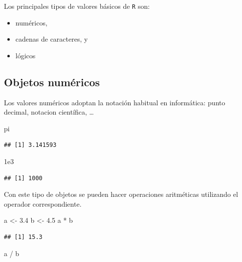 \documentclass[
]{book}
\newenvironment{Shaded}{\begin{snugshade}}{\end{snugshade}}
\newcommand{\FloatTok}[1]{\textcolor[rgb]{0.00,0.00,0.81}{#1}}
\newcommand{\NormalTok}[1]{#1}
\newcommand{\OtherTok}[1]{\textcolor[rgb]{0.56,0.35,0.01}{#1}}
\newcommand{\SpecialCharTok}[1]{\textcolor[rgb]{0.00,0.00,0.00}{#1}}
\theoremstyle{break}
\theoremstyle{nonumberplain}
\begin{document}
Los principales tipos de valores básicos de \texttt{R} son:

\begin{itemize}
\item
  numéricos,
\item
  cadenas de caracteres, y
\item
  lógicos
\end{itemize}

\hypertarget{objetos-numuxe9ricos}{%
\subsection{Objetos numéricos}\label{objetos-numuxe9ricos}}

Los valores numéricos adoptan
la notación habitual en informática: punto decimal, notacion científica, \ldots{}

\begin{Shaded}
\begin{Highlighting}[]
\NormalTok{pi}
\end{Highlighting}
\end{Shaded}

\begin{verbatim}
## [1] 3.141593
\end{verbatim}

\begin{Shaded}
\begin{Highlighting}[]
\FloatTok{1e3}
\end{Highlighting}
\end{Shaded}

\begin{verbatim}
## [1] 1000
\end{verbatim}

Con este tipo de objetos se pueden hacer operaciones aritméticas
utilizando el operador correspondiente.

\begin{Shaded}
\begin{Highlighting}[]
\NormalTok{a }\OtherTok{\textless{}{-}} \FloatTok{3.4}
\NormalTok{b }\OtherTok{\textless{}{-}} \FloatTok{4.5}
\NormalTok{a }\SpecialCharTok{*}\NormalTok{ b}
\end{Highlighting}
\end{Shaded}

\begin{verbatim}
## [1] 15.3
\end{verbatim}

\begin{Shaded}
\begin{Highlighting}[]
\NormalTok{a }\SpecialCharTok{/}\NormalTok{ b}
\end{Highlighting}
\end{Shaded}
\end{document}
